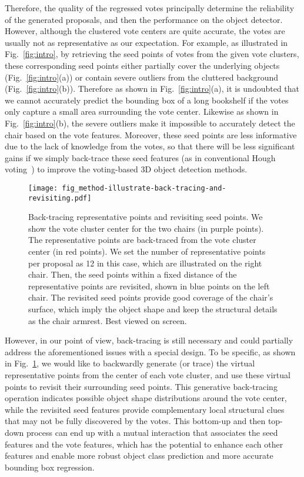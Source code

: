 \documentclass[final]{cvpr}
\begin{document}
Therefore, the quality of the regressed votes principally determine the reliability of the generated proposals, and then the performance on the object detector.
However, although the clustered vote centers are quite accurate, the votes are usually not as representative as our expectation.
For example, as illustrated in Fig.~\ref{fig:intro}, by retrieving the seed points of votes from the given vote clusters, these corresponding seed points either partially cover the underlying objects (Fig.~\ref{fig:intro}(a)) or contain severe outliers from the cluttered background (Fig.~\ref{fig:intro}(b)).
Therefore as shown in Fig.~\ref{fig:intro}(a), it is undoubted that we cannot accurately predict the bounding box of a long bookshelf if the votes only capture a small area surrounding the vote center.
Likewise as shown in Fig.~\ref{fig:intro}(b), the severe outliers make it impossible to accurately detect the chair based on the vote features.
Moreover, these seed points are less informative due to the lack of knowledge from the votes, so that there will be less significant gains if we simply back-trace these seed features (as in conventional Hough voting~\cite{robust-hough}) to improve the voting-based 3D object detection methods.

\begin{figure}
    \centering
    \texttt{[image: fig\_method-illustrate-back-tracing-and-revisiting.pdf]}
    \caption{
        Back-tracing representative points and revisiting seed points. 
We show the vote cluster center for the two chairs (in purple points). 
The representative points are back-traced from the vote cluster center (in red points).
We set the number of representative points per proposal as 12 in this case, which are illustrated on the right chair. 
Then, the seed points within a fixed distance of the representative points are revisited, shown in blue points on the left chair. 
The revisited seed points provide good coverage of the chair's surface, which imply the object shape and keep the structural details as the chair armrest. Best viewed on screen.}
\label{fig:illustrate-back-tracing}
\end{figure}

However, in our point of view, back-tracing is still necessary and could partially address the aforementioned issues with a special design.
To be specific, as shown in Fig.~\ref{fig:illustrate-back-tracing}, we would like to backwardly generate (or trace) the virtual representative points from the center of each vote cluster, and use these virtual points to revisit their surrounding seed points.
This generative back-tracing operation indicates possible object shape distributions around the vote center, while the revisited seed features provide complementary local structural clues that may not be fully discovered by the votes.
This bottom-up and then top-down process can end up with a mutual interaction that associates the seed features and the vote features, which has the potential to enhance each other features and enable more robust object class prediction and more accurate bounding box regression.
\end{document}
